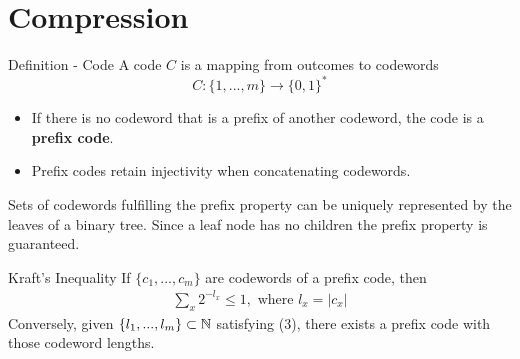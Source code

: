 \section{Compression}

\begin{mainbox}
    {Definition - Code} 
    A code \(C\) is a mapping from outcomes to codewords
    \[C: \{1, ..., m\} \to \{0, 1\}^*\]
    \begin{itemize}[label=-]
        \item If there is no codeword that is a prefix of another codeword, the code is a \textbf{prefix code}. 
        \item Prefix codes retain injectivity when concatenating codewords.
    \end{itemize}
\end{mainbox}
Sets of codewords fulfilling the prefix property can be uniquely represented by the leaves of a binary tree. 
Since a leaf node has no children the prefix property is guaranteed.

\begin{mainbox}
    {Kraft's Inequality}
    If \(\{c_1, ...,c_m\}\) are codewords of a prefix code, then 
\begin{align}
    \sum_{x}2^{-l_x} \leq 1, \text{ where }l_x = |c_x|
\end{align}
Conversely, given \(\{l_1, ..., l_m\} \subset \mathbb{N}\) satisfying (3), there exists a prefix code with those codeword lengths.
\end{mainbox}


